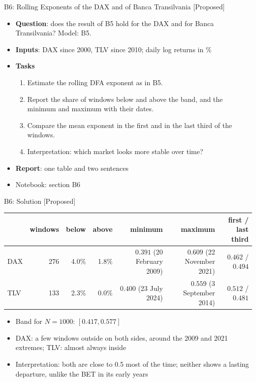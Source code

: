 \begin{frame}{B6: Rolling Exponents of the DAX and of Banca Transilvania [Proposed]}
\itemsize{\footnotesize}
\begin{itemize}
\item \textbf{Question}: does the result of B5 hold for the DAX and for Banca Transilvania? Model: B5.
\item \textbf{Inputs}: DAX since 2000, TLV since 2010; daily log returns in \%
\item \textbf{Tasks}
\begin{enumerate}
    \item Estimate the rolling DFA exponent as in B5.
    \item Report the share of windows below and above the band, and the minimum and maximum with their dates.
    \item Compare the mean exponent in the first and in the last third of the windows.
    \item Interpretation: which market looks more stable over time?
\end{enumerate}
\item \textbf{Report}: one table and two sentences
\item Notebook: section B6
\end{itemize}
\end{frame}

\ifsolutions
\begin{frame}{B6: Solution [Proposed]}
\itemsize{\footnotesize}
\begin{center}
\scriptsize
\begin{tabular}{lrrrrrr}
\toprule
 & windows & below & above & minimum & maximum & first / last third \\
\midrule
DAX & 276 & 4.0\% & 1.8\% & $0.391$ (20 February 2009) & $0.609$ (22 November 2021) & $0.462$ / $0.494$ \\
TLV & 133 & 2.3\% & 0.0\% & $0.400$ (23 July 2024) & $0.559$ (3 September 2014) & $0.512$ / $0.481$ \\
\bottomrule
\end{tabular}
\end{center}
\begin{itemize}
    \item Band for $N = 1000$: $[0.417, 0.577]$
    \item DAX: a few windows outside on both sides, around the 2009 and 2021 extremes; TLV: almost always inside
    \item Interpretation: both are close to 0.5 most of the time; neither shows a lasting departure, unlike the BET in its early years
\end{itemize}
\end{frame}
\fi



